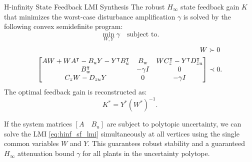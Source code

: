 \begin{mytheorem}{H-infinity State Feedback LMI Synthesis}
The robust $H_\infty$ state feedback gain $K$ that minimizes the worst-case disturbance amplification $\gamma$ is solved by the following convex semidefinite program:
\begin{equation}
\min_{W, Y} \gamma \quad \text{subject to} .
\end{equation}
\begin{align}
    W &\succ 0 \\
    \begin{bmatrix} A W + W A^\intercal - B_u Y - Y^\intercal B_u^\intercal & B_w & W C_z^\intercal - Y^\intercal D_{zu}^\intercal \\ B_w^\intercal & -\gamma I & 0 \\ C_z W - D_{zu} Y & 0 & -\gamma I \end{bmatrix} &\prec 0 . \label{eq:hinf_sf_lmi}
\end{align}
The optimal feedback gain is reconstructed as:
\begin{equation}
K^* = Y^* (W^*)^{-1} .
\end{equation}
\end{mytheorem}
If the system matrices $[A \quad B_u]$ are subject to polytopic uncertainty, we can solve the LMI \eqref{eq:hinf_sf_lmi} simultaneously at all vertices using the single common variables $W$ and $Y$. This guarantees robust stability and a guaranteed $H_\infty$ attenuation bound $\gamma$ for all plants in the uncertainty polytope.
